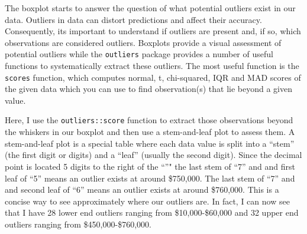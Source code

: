 \documentclass[]{article}
\newenvironment{Shaded}{\begin{snugshade}}{\end{snugshade}}
\newcommand{\KeywordTok}[1]{\textcolor[rgb]{0.13,0.29,0.53}{\textbf{#1}}}
\newcommand{\DataTypeTok}[1]{\textcolor[rgb]{0.13,0.29,0.53}{#1}}
\newcommand{\FloatTok}[1]{\textcolor[rgb]{0.00,0.00,0.81}{#1}}
\newcommand{\StringTok}[1]{\textcolor[rgb]{0.31,0.60,0.02}{#1}}
\newcommand{\OperatorTok}[1]{\textcolor[rgb]{0.81,0.36,0.00}{\textbf{#1}}}
\newcommand{\NormalTok}[1]{#1}
\begin{document}
The boxplot starts to answer the question of what potential outliers
exist in our data. Outliers in data can distort predictions and affect
their accuracy. Consequently, its important to understand if outliers
are present and, if so, which observations are considered outliers.
Boxplots provide a visual assessment of potential outliers while the
\texttt{outliers} package provides a number of useful functions to
systematically extract these outliers. The most useful function is the
\texttt{scores} function, which computes normal, t, chi-squared, IQR and
MAD scores of the given data which you can use to find observation(s)
that lie beyond a given value.

Here, I use the \texttt{outliers::score} function to extract those
observations beyond the whiskers in our boxplot and then use a
stem-and-leaf plot to assess them. A stem-and-leaf plot is a special
table where each data value is split into a ``stem'' (the first digit or
digits) and a ``leaf'' (usually the second digit). Since the decimal
point is located 5 digits to the right of the ``\textbar{}''" the last
stem of ``7'' and and first leaf of ``5'' means an outlier exists at
around \$750,000. The last stem of ``7'' and and second leaf of ``6''
means an outlier exists at around \$760,000. This is a concise way to
see approximately where our outliers are. In fact, I can now see that I
have 28 lower end outliers ranging from \$10,000-\$60,000 and 32 upper
end outliers ranging from \$450,000-\$760,000.

\begin{Shaded}
\end{Shaded}
\end{document}

